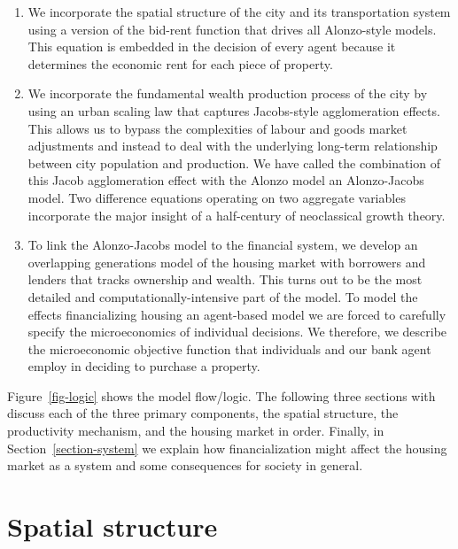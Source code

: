 \begin{enumerate}
\item We incorporate the spatial structure of the city and its transportation system using a version of the \gls{bid-rent function} that drives all Alonzo-style models. This equation is embedded in the decision of every agent because it determines the economic rent  for each piece of property.

\item We incorporate the fundamental wealth production process of the city by using an \gls{urban scaling} law that captures Jacobs-style agglomeration effects. This allows us to bypass the complexities of labour and goods market adjustments and  instead to deal with the underlying long-term relationship between city  population and production. We have called the combination of this Jacob agglomeration effect with the Alonzo model an \gls{Alonzo-Jacobs model}.  Two difference equations operating on two aggregate variables incorporate the major insight of a half-century of \gls{neoclassical growth theory}.

\item To link the Alonzo-Jacobs model to the financial system, we develop an \gls{overlapping generations} model of the housing market with borrowers and lenders that tracks ownership and wealth. This turns out to be the most detailed and computationally-intensive part of the model. To model the effects financializing housing an \gls{agent-based model} we are forced to carefully specify the microeconomics of  individual decisions. %
We therefore, we describe the microeconomic objective function that individuals and our bank agent employ in deciding to purchase a property. 
\end{enumerate}

Figure~\ref{fig-logic} shows the model flow/logic.  The following three sections with discuss each of the three primary components, the spatial structure, the productivity mechanism, and the housing market in order. Finally, in  Section~\ref{section-system} we explain how financialization might affect the housing market as a system and some consequences for society in general. %

\section{Spatial structure}

